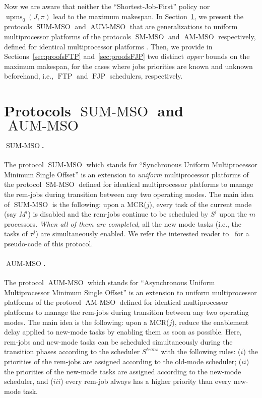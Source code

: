 \documentclass[10pt,english,a4paper]{article}
\newtheorem{validity test}{Validity Test}
\newcommand{\upms}{\operatorname{upms}}
\newcommand{\FTP}{\operatorname{FTP}}
\newcommand{\FJP}{\operatorname{FJP}}
\newcommand{\SUMMSO}{\operatorname{SUM-MSO}}
\newcommand{\AUMMSO}{\operatorname{AUM-MSO}}
\newcommand{\SMMSO}{\operatorname{SM-MSO}}
\newcommand{\AMMSO}{\operatorname{AM-MSO}}
\begin{document}
Now we are aware that neither the ``Shortest-Job-First'' policy nor $\upms_0(J, \pi)$ lead to the maximum makespan. In Section~\ref{sec:protocols}, we present the protocols $\SUMMSO$ and $\AUMMSO$ that are generalizations to uniform multiprocessor platforms of the protocols $\SMMSO$ and $\AMMSO$ respectively, defined for identical multiprocessor platforms \cite{Nelis1}. Then, we provide in Sections~\ref{sec:proofsFTP} and~\ref{sec:proofsFJP} two distinct {\em upper} bounds on the maximum makespan, for the cases where jobs priorities are known and unknown beforehand, i.e., $\FTP$ and $\FJP$ schedulers, respectively.

\section{Protocols $\SUMMSO$ and $\AUMMSO$}
\label{sec:protocols}

\paragraph{$\SUMMSO$.} The protocol $\SUMMSO$ which stands for ``Synchronous Uniform Multiprocessor Minimum Single Offset'' is an extension to {\em uniform} multiprocessor platforms of the protocol $\SMMSO$ defined for identical multiprocessor platforms \cite{Nelis1} to manage the rem-jobs during transition between any two operating modes. The main idea of $\SUMMSO$ is the following: upon a MCR($j$), every task of the current mode (say $M^i$) is disabled and the rem-jobs continue to be scheduled by $S^i$ upon the $m$ processors. \emph{When all of them are completed}, all the new mode tasks (i.e., the tasks of $\tau^j$) are simultaneously enabled. We refer the interested reader to~\cite{Nelis1} for a pseudo-code of this protocol.

\paragraph{$\AUMMSO$.} The protocol $\AUMMSO$ which stands for ``Asynchronous Uniform Multiprocessor Minimum Single Offset'' is an extension to uniform multiprocessor platforms of the protocol $\AMMSO$ defined for identical multiprocessor platforms \cite{Nelis1} to manage the rem-jobs during transition between any two operating modes. The main idea is the following: upon a MCR($j$), reduce the enablement delay applied to new-mode tasks by enabling them as soon as possible. Here, rem-jobs and new-mode tasks can be scheduled simultaneously during the transition phases according to the scheduler $S^{trans}$ with the following rules: ($i$) the priorities of the rem-jobs are assigned according to the old-mode scheduler; ($ii$) the priorities of the new-mode tasks are assigned according to the new-mode scheduler, and ($iii$) every rem-job always has a higher priority than every new-mode task.
\end{document}

